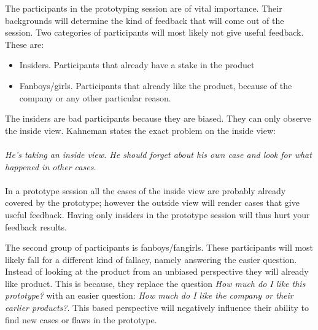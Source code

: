 \documentclass[Main.tex]{subfiles}
\begin{document}
The participants in the prototyping session are of vital importance. Their backgrounds will determine the kind of feedback that will come out of the session. Two categories of participants will most likely not give useful feedback. These are:

\begin{itemize}
\item Insiders. Participants that already have a stake in the product
\item Fanboys/girls. Participants that already like the product, because of the company or any other particular reason.
\end{itemize}
The insiders are bad participants because they are biased. They can only observe the inside view. Kahneman states the exact problem on the inside view: \\ \\
\emph{He's taking an inside view. He should forget about his own case and look for what happened in other cases.} \\ \\
In a prototype session all the cases of the inside view are probably already covered by the prototype; however the outside view will render cases that give useful feedback. Having only insiders in the prototype session will thus hurt your feedback results.

The second group of participants is fanboys/fangirls. These participants will most likely fall for a different kind of fallacy, namely answering the easier question. Instead of looking at the product from an unbiased perspective they will already like product. This is because, they replace the question \emph{How much do I like this prototype?} with an easier question: \emph{How much do I like the company or their earlier products?}. This based perspective will negatively influence their ability to find new cases or flaws in the prototype.
\end{document}
